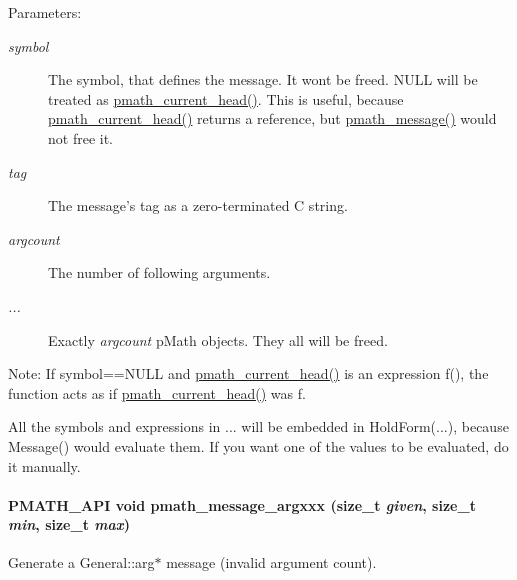 \begin{Desc}
\item[Parameters:]
\begin{description}
\item[{\em symbol}]The symbol, that defines the message. It wont be freed. NULL will be treated as \hyperlink{group__helpers_g70aa270956b6c8f8eb43431f9775ae88}{pmath\_\-current\_\-head()}. This is useful, because \hyperlink{group__helpers_g70aa270956b6c8f8eb43431f9775ae88}{pmath\_\-current\_\-head()} returns a reference, but \hyperlink{group__messages_g0b94d5352ce3c6df0ca458d3c5cd7e15}{pmath\_\-message()} would not free it. \item[{\em tag}]The message's tag as a zero-terminated C string. \item[{\em argcount}]The number of following arguments. \item[{\em ...}]Exactly {\em argcount\/} pMath objects. They all will be freed.\end{description}
\end{Desc}
\begin{Desc}
\item[Note:]If symbol==NULL and \hyperlink{group__helpers_g70aa270956b6c8f8eb43431f9775ae88}{pmath\_\-current\_\-head()} is an expression f(), the function acts as if \hyperlink{group__helpers_g70aa270956b6c8f8eb43431f9775ae88}{pmath\_\-current\_\-head()} was f.

All the symbols and expressions in ... will be embedded in HoldForm(...), because Message() would evaluate them. If you want one of the values to be evaluated, do it manually. \end{Desc}
\hypertarget{group__messages_gc917f491312d93a2f437e287ec8baefe}{
\paragraph[{pmath\_\-message\_\-argxxx}]{\setlength{\rightskip}{0pt plus 5cm}PMATH\_\-API void pmath\_\-message\_\-argxxx (size\_\-t {\em given}, \/  size\_\-t {\em min}, \/  size\_\-t {\em max})}\hfill}
\label{group__messages_gc917f491312d93a2f437e287ec8baefe}


Generate a General::arg$\ast$ message (invalid argument count). 

